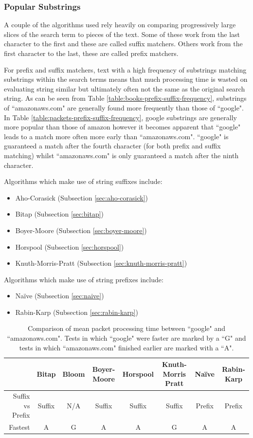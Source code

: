 \documentclass{article}
\begin{document}
\subsubsection{Popular Substrings}

A couple of the algorithms used rely heavily on comparing progressively large slices of the search term to pieces of the text. Some of these work from the last character to the first and these are called suffix matchers. Others work from the first character to the last, these are called prefix matchers. 

For prefix and suffix matchers, text with a high frequency of substrings matching substrings within the search terms means that much processing time is wasted on evaluating string similar but ultimately often not the same as the original search string. As can be seen from Table \ref{table:books-prefix-suffix-frequency}, substrings of ``amazonaws.com" are generally found more frequently than those of ``google". In Table \ref{table:packets-prefix-suffix-frequency}, google substrings are generally more popular than those of amazon however it becomes apparent that ``google" leads to a match more often more early than ``amazonaws.com". ``google" is guaranteed a match after the fourth character (for both prefix and suffix matching) whilst ``amazonaws.com" is only guaranteed a match after the ninth character.

Algorithms which make use of string suffixes include:
\begin{itemize}
  \item Aho-Corasick (Subsection \ref{sec:aho-corasick})
  \item Bitap (Subsection \ref{sec:bitap})
  \item Boyer-Moore (Subsection \ref{sec:boyer-moore})
  \item Horspool (Subsection \ref{sec:horspool})
  \item Knuth-Morris-Pratt (Subsection \ref{sec:knuth-morris-pratt})
\end{itemize}

Algorithms which make use of string prefixes include:
\begin{itemize}
  \item Na{\"i}ve (Subsection \ref{sec:naive})
  \item Rabin-Karp (Subsection \ref{sec:rabin-karp})
\end{itemize}

\begin{table}[h!bt]
  \centering
  \begin{tabular}{r|ccccccc}
    & Bitap & Bloom & Boyer-Moore & Horspool & Knuth-Morris Pratt & Na{\"i}ve & Rabin-Karp\\
    \hline
    Suffix vs Prefix & Suffix & N/A & Suffix & Suffix & Suffix & Prefix & Prefix \\ 
    Fastest & A & G & A & A & G & A & A
  \end{tabular}
  \caption{Comparison of mean packet processing time between ``google" and ``amazonaws.com". Tests in which ``google" were faster are marked by a ``G" and tests in which ``amazonaws.com" finished earlier are marked with a ``A".}
  \label{table:packet-mean-comparison}
\end{table}
\end{document}
